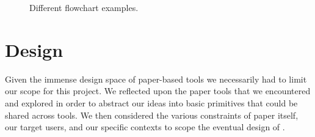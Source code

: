 \documentclass{sig-alternate}
\begin{document}
\begin{figure}%
    \centering
    \qquad
    \caption{Different flowchart examples.}%
    \label{fig:flowchart-examples}%
\end{figure}


\section{Design}

Given the immense design space of paper-based tools we necessarily had to limit our scope for this project. We reflected upon the paper tools that we encountered and explored in order to abstract our ideas into basic primitives that could be shared across tools. We then considered the various constraints of paper itself, our target users, and our specific contexts to scope the eventual design of \nifty.
\end{document}
